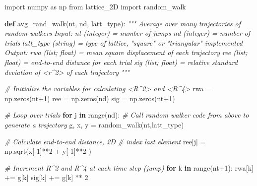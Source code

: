 \documentclass[11pt]{article}
\newenvironment{Shaded}{}{}
\newcommand{\KeywordTok}[1]{\textcolor[rgb]{0.00,0.44,0.13}{\textbf{{#1}}}}
\newcommand{\DecValTok}[1]{\textcolor[rgb]{0.25,0.63,0.44}{{#1}}}
\newcommand{\CommentTok}[1]{\textcolor[rgb]{0.38,0.63,0.69}{\textit{{#1}}}}
\newcommand{\NormalTok}[1]{{#1}}
\newcommand{\ImportTok}[1]{{#1}}
\newcommand{\ControlFlowTok}[1]{\textcolor[rgb]{0.00,0.44,0.13}{\textbf{{#1}}}}
\newcommand{\OperatorTok}[1]{\textcolor[rgb]{0.40,0.40,0.40}{{#1}}}
\newcommand{\BuiltInTok}[1]{{#1}}
\begin{document}
    \begin{Shaded}
\begin{Highlighting}[]
\ImportTok{import}\NormalTok{ numpy }\ImportTok{as}\NormalTok{ np}
\ImportTok{from}\NormalTok{ lattice\_2D }\ImportTok{import}\NormalTok{ random\_walk}

\KeywordTok{def}\NormalTok{ avg\_rand\_walk(nt, nd, latt\_type):}
    \CommentTok{""" Average over many trajectories of random walkers}
\CommentTok{        Input:}
\CommentTok{            nt (integer) = number of jumps}
\CommentTok{            nd (integer) = number of trials }
\CommentTok{            latt\_type (string) = type of lattice,}
\CommentTok{                                 "square" or "triangular" implemented}
\CommentTok{        Output:}
\CommentTok{            rwa (list; float) = mean square displacement of each trajectory}
\CommentTok{            ree (list; float) = end{-}to{-}end distance for each trial}
\CommentTok{            sig (list; float) = relative standard deviation of \textless{}r\^{}2\textgreater{}}
\CommentTok{                                of each trajectory}
\CommentTok{    """}

    \CommentTok{\# Initialize the variables for calculating \textless{}R\^{}2\textgreater{} and \textless{}R\^{}4\textgreater{}}
\NormalTok{    rwa }\OperatorTok{=}\NormalTok{ np.zeros(nt}\OperatorTok{+}\DecValTok{1}\NormalTok{)}
\NormalTok{    ree }\OperatorTok{=}\NormalTok{ np.zeros(nd)}
\NormalTok{    sig }\OperatorTok{=}\NormalTok{ np.zeros(nt}\OperatorTok{+}\DecValTok{1}\NormalTok{)}

    \CommentTok{\# Loop over trials}
    \ControlFlowTok{for}\NormalTok{ j }\KeywordTok{in} \BuiltInTok{range}\NormalTok{(nd):}
        \CommentTok{\# Call random walker code from above to generate a trajectory}
\NormalTok{        g, x, y }\OperatorTok{=}\NormalTok{ random\_walk(nt,latt\_type)}

        \CommentTok{\# Calculate end{-}to{-}end distance, 2D}
        \CommentTok{\# index last element}
\NormalTok{        ree[j] }\OperatorTok{=}\NormalTok{ np.sqrt(x[}\OperatorTok{{-}}\DecValTok{1}\NormalTok{]}\OperatorTok{**}\DecValTok{2} \OperatorTok{+}\NormalTok{ y[}\OperatorTok{{-}}\DecValTok{1}\NormalTok{]}\OperatorTok{**}\DecValTok{2}\NormalTok{ )}

        \CommentTok{\# Increment R\^{}2 and R\^{}4 at each time step (jump)}
        \ControlFlowTok{for}\NormalTok{ k }\KeywordTok{in} \BuiltInTok{range}\NormalTok{(nt}\OperatorTok{+}\DecValTok{1}\NormalTok{):}
\NormalTok{            rwa[k] }\OperatorTok{+=}\NormalTok{ g[k]}
\NormalTok{            sig[k] }\OperatorTok{+=}\NormalTok{ g[k] }\OperatorTok{**} \DecValTok{2}


\end{Highlighting}
\end{Shaded}
\end{document}
